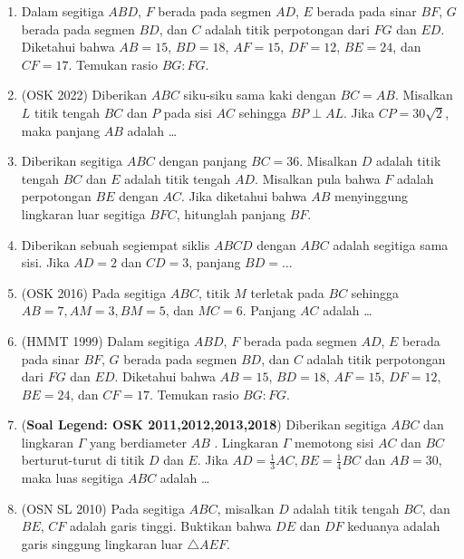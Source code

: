 \documentclass[12pt]{scrartcl}
\begin{document}
\begin{enumerate}
        \item Dalam segitiga $ABD$, $F$ berada pada segmen $AD$, $E$ berada pada sinar $BF$, $G$ berada pada segmen $BD$, dan $C$ adalah titik perpotongan dari $FG$ dan $ED$. Diketahui bahwa $AB = 15$, $BD = 18$, $AF = 15$, $DF = 12$, $BE = 24$, dan $CF = 17$. Temukan rasio $BG : FG$.

    \item (OSK 2022) Diberikan $ABC$ siku-siku sama kaki dengan $BC=AB$. Misalkan $L$ titik tengah $BC$ dan $P$ pada sisi $AC$ sehingga $BP \perp AL$. Jika $CP=30\sqrt{2}$, maka panjang $AB$ adalah \ldots

    \item Diberikan segitiga $ABC$ dengan panjang $BC = 36$. Misalkan $D$ adalah titik tengah $BC$ dan $E$ adalah titik tengah $AD$. Misalkan pula bahwa $F$ adalah perpotongan $BE$ dengan $AC$. Jika diketahui bahwa $AB$ menyinggung lingkaran luar segitiga $BFC$, hitunglah panjang $BF$.

    \item Diberikan sebuah segiempat siklis $ABCD$ dengan $ABC$ adalah segitiga sama sisi. Jika $AD=2$ dan $CD=3$, panjang $BD=\dots$

        \item (OSK 2016) Pada segitiga $ABC$, titik $M$ terletak pada $BC$ sehingga $AB=7, AM=3, BM=5$, dan $MC=6$. Panjang $AC$ adalah \dots

    \item (HMMT 1999) Dalam segitiga $ABD$, $F$ berada pada segmen $AD$, $E$ berada pada sinar $BF$, $G$ berada pada segmen $BD$, dan $C$ adalah titik perpotongan dari $FG$ dan $ED$. Diketahui bahwa $AB = 15$, $BD = 18$, $AF = 15$, $DF = 12$, $BE = 24$, dan $CF = 17$. Temukan rasio $BG : FG$.

    \item (\textbf{Soal Legend: OSK 2011,2012,2013,2018}) Diberikan segitiga $ABC$ dan lingkaran $\Gamma$ yang berdiameter $AB$ . Lingkaran $\Gamma$ memotong sisi $AC$ dan $BC$ berturut-turut di titik $D$ dan $E$. Jika $AD = \frac13 AC, BE =\frac14 BC$ dan $AB = 30$, maka luas segitiga $ABC$ adalah \dots

    \item (OSN SL 2010) Pada segitiga $ABC$, misalkan $D$ adalah titik tengah $BC$, dan $BE$, $CF$ adalah garis tinggi. Buktikan bahwa $DE$ dan $DF$ keduanya adalah garis singgung lingkaran luar $\triangle AEF$. %


\end{enumerate}
\end{document}

